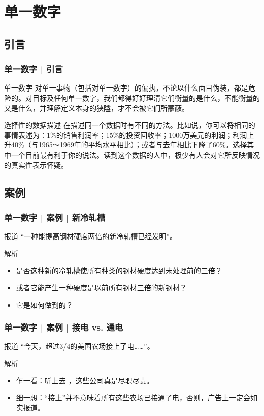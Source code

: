 \section{单一数字}
\subsection{引言}
\begin{frame}
  \frametitle{单一数字 | 引言}
  \begin{block}{单一数字}
对单一事物（包括对单一数字）的偏执，不论以什么面目伪装，都是危险的。对目标及任何单一数字，我们都得好好理清它们衡量的是什么，不能衡量的又是什么，并理解定义本身的狭隘，才不会被它们所蒙蔽。
  \end{block}
  \pause
  \begin{block}{选择性的数据描述}
在描述同一个数据时有不同的方法。比如说，你可以将相同的事情表述为：1\%的销售利润率；15\%的投资回收率；1000万美元的利润；利润上升40\%（与1965～1969年的平均水平相比）；或者与去年相比下降了60\%。选择其中一个目前最有利于你的说法。读到这个数据的人中，极少有人会对它所反映情况的真实性表示怀疑。
  \end{block}
\end{frame}

\subsection{案例}
\begin{frame}
  \frametitle{单一数字 | 案例 | 新冷轧槽}
  \begin{block}{报道}
    “一种能提高钢材硬度两倍的新冷轧槽已经发明”。
  \end{block}
  \pause \pause \pause \pause
  \begin{block}{解析}
    \begin{itemize}
      \item 是否这种新的冷轧槽使所有种类的钢材硬度达到未处理前的三倍？
      \item 或者它能产生一种硬度是以前所有钢材三倍的新钢材？
      \item 它是如何做到的？
    \end{itemize}
  \end{block}
\end{frame}

\begin{frame}
  \frametitle{单一数字 | 案例 | 接电 vs. 通电}
  \begin{block}{报道}
  “今天，超过3/4的美国农场接上了电……”。
  \end{block}
  \pause \pause \pause \pause
  \begin{block}{解析}
    \begin{itemize}
      \item 乍一看：听上去 ，这些公司真是尽职尽责。
      \item 细一想：“接上”并不意味着所有这些农场已接通了电，否则，广告上一定会如实报道。
    \end{itemize}
  \end{block}
\end{frame}

